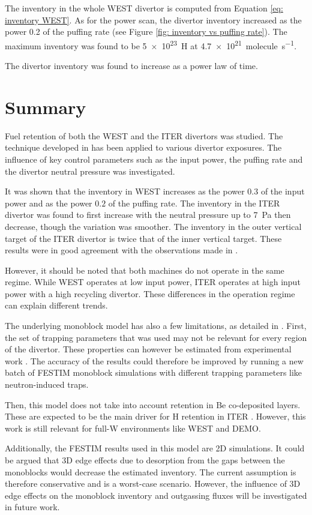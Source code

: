The inventory in the whole WEST divertor is computed from Equation \eqref{eq: inventory WEST}.
As for the power scan, the divertor inventory increased as the power 0.2 of the puffing rate (see Figure \ref{fig: inventory vs puffing rate}).
The maximum inventory was found to be \SI{5e23}{H} at \SI{4.7e21}{molecule.s^{-1}}.

The divertor inventory was found to increase as a power law of time.

\section{Summary}

Fuel retention of both the WEST and the ITER divertors was studied.
The technique developed in  has been applied to various divertor exposures.
The influence of key control parameters such as the input power, the puffing rate and the divertor neutral pressure was investigated.

It was shown that the inventory in WEST increases as the power $0.3$ of the input power and as the power $0.2$ of the puffing rate.
The inventory in the ITER divertor was found to first increase with the neutral pressure up to \SI{7}{Pa} then decrease, though the variation was smoother.
The inventory in the outer vertical target of the ITER divertor is twice that of the inner vertical target.
These results were in good agreement with the observations made in .

However, it should be noted that both machines do not operate in the same regime.
While WEST operates at low input power, ITER operates at high input power with a high recycling divertor.
These differences in the operation regime can explain different trends.

The underlying monoblock model has also a few limitations, as detailed in .
First, the set of trapping parameters that was used may not be relevant for every region of the divertor.
These properties can however be estimated from experimental work .
The accuracy of the results could therefore be improved by running a new batch of FESTIM monoblock simulations with different trapping parameters like neutron-induced traps.

Then, this model does not take into account retention in Be co-deposited layers.
These are expected to be the main driver for H retention in ITER .
However, this work is still relevant for full-W environments like WEST and DEMO.

Additionally, the FESTIM results used in this model are 2D simulations.
It could be argued that 3D edge effects due to desorption from the gaps between the monoblocks would decrease the estimated inventory.
The current assumption is therefore conservative and is a worst-case scenario.
However, the influence of 3D edge effects on the monoblock inventory and outgassing fluxes will be investigated in future work.

